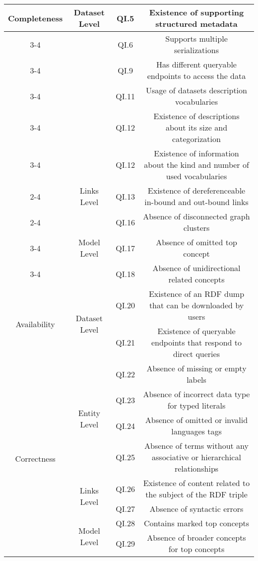 \documentclass[onecolumn, crcready]{iosart2c}
\begin{document}
\begin{landscape}
\begin{center}
{\begin{longtable}[h]{|c|c|c|c|}
\multirow{19}{*}{Completeness}
 & \multirow{5}{*}{Dataset Level} & QI.5 & Existence of supporting structured metadata  \cite{Hogan2010}\tabularnewline
\cline{3-4}
 &  & QI.6 & Supports multiple serializations \cite{Framework2012}\tabularnewline
\cline{3-4}
 &  & QI.9 & Has different queryable endpoints to access the data \cite{Framework2012}\tabularnewline
\cline{3-4}
 &  & QI.11 & Usage of datasets description vocabularies \tabularnewline
\cline{3-4}
 &  & QI.12 & Existence of descriptions about its size and categorization \tabularnewline
 \cline{3-4}
 &  & QI.12 & Existence of information about the kind and number of used vocabularies \cite{Framework2012}\tabularnewline
\cline{2-4}
 & \multirow{1}{*}{Links Level} & QI.13 & Existence of dereferenceable in-bound and out-bound links \cite{Hogan2010}\cite{Mader2012}\cite{Gueret2012}\tabularnewline
\cline{2-4}
 & \multirow{3}{*}{Model Level} & QI.16 & Absence of disconnected graph clusters \cite{Mader2012}\tabularnewline
\cline{3-4}
 &  & QI.17 & Absence of omitted top concept \cite{Hogan2010}\tabularnewline
\cline{3-4}
 &  & QI.18 & Absence of unidirectional related concepts \cite{Hogan2010}\tabularnewline
\hline
\hline
\multirow{2}{*}{Availability} & \multirow{2}{*}{Dataset Level} & QI.20 & Existence of an RDF dump that can be downloaded by users \cite{flemming2010}\cite{Hogan2010}\tabularnewline
\cline{3-4}
 &  & QI.21 & Existence of queryable endpoints that respond to direct queries\tabularnewline
\hline
\hline
\multirow{8}{*}{Correctness} & \multirow{4}{*}{Entity Level} & QI.22 & Absence of missing or empty labels \cite{Acosta2013}\cite{Mader2012}\tabularnewline
\cline{3-4}
 &  & QI.23 & Absence of incorrect data type for typed literals \cite{Hogan2010}\cite{Acosta2013} \tabularnewline
\cline{3-4}
 &  & QI.24 & Absence of omitted or invalid languages tags \cite{Suominen:2012:IQS:2413941.2413985}\cite{Mader2012}\tabularnewline
\cline{3-4}
 &  & QI.25 & Absence of terms without any associative or hierarchical relationships \cite{journals/ires/Living10}\tabularnewline
\cline{2-4}
 & \multirow{2}{*}{Links Level} & QI.26 & Existence of content related to the subject of the RDF triple \cite{Suominen:2012:IQS:2413941.2413985}\cite{Acosta2013}\tabularnewline
\cline{3-4}
 &  & QI.27 & Absence of syntactic errors  \cite{Suominen2013}\tabularnewline
\cline{2-4}
 & \multirow{2}{*}{Model Level} & QI.28 & Contains marked top concepts \cite{Mader2012}\tabularnewline
\cline{3-4}
 &  & QI.29 & Absence of broader concepts for top concepts \cite{Mader2012}\tabularnewline

\end{longtable}}
\end{center}
\end{landscape}
\end{document}
